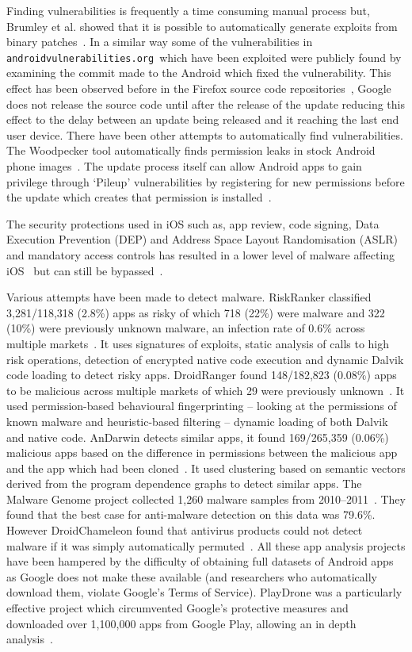 \documentclass[conference,a4paper,twoside]{IEEEtran}
\let\OldTodo\todo
\renewcommand{\todo}{\OldTodo[inline]}
\newcommand{\todolater}[1]{}%
\newcommand{\avo}{\texttt{androidvulnerabilities.org}}
\begin{document}
Finding vulnerabilities is frequently a time consuming manual process but, Brumley et al. showed that it is possible to automatically generate exploits from binary patches~\cite{Brumley2008}.
In a similar way some of the vulnerabilities\todolater{which?} in \avo\ which have been exploited were publicly found by examining the commit made to the Android which fixed the vulnerability.
This effect has been observed before in the Firefox source code repositories~\cite{Barth2011}, Google does not release the source code until after the release of the update reducing this effect to the delay between an update being released and it reaching the last end user device.
There have been other attempts to automatically find vulnerabilities.
The Woodpecker tool automatically finds permission leaks in stock Android phone images~\cite{Grace2012}.
The update process itself can allow Android apps to gain privilege through `Pileup' vulnerabilities by registering for new permissions before the update which creates that permission is installed~\cite{Xing2014}.

The security protections used in iOS such as, app review, code signing, Data Execution Prevention (DEP) and Address Space Layout Randomisation (ASLR) and mandatory access controls has resulted in a lower level of malware affecting iOS~\cite{Felt2011} but can still be bypassed~\cite{Wang2013a}.

Various attempts have been made to detect malware.
RiskRanker classified 3,281/118,318 (2.8\%) apps as risky of which 718 (22\%) were malware and 322 (10\%) were previously unknown malware, an infection rate of 0.6\% across multiple markets~\cite{Grace2012a}.
It uses signatures of exploits, static analysis of calls to high risk operations, detection of encrypted native code execution and dynamic Dalvik code loading to detect risky apps.
DroidRanger found 148/182,823 (0.08\%) apps to be malicious across multiple markets of which 29 were previously unknown~\cite{Zhou2012a}.
It used permission-based behavioural fingerprinting -- looking at the permissions of known malware and heuristic-based filtering -- dynamic loading of both Dalvik and native code.
AnDarwin detects similar apps, it found 169/265,359 (0.06\%) malicious apps based on the difference in permissions between the malicious app and the app which had been cloned~\cite{Crussell2013}.
It used clustering based on semantic vectors derived from the program dependence graphs to detect similar apps.
The Malware Genome project collected 1,260 malware samples from 2010--2011~\cite{Zhou2012b}.
They found that the best case for anti-malware detection on this data was 79.6\%.
However DroidChameleon found that antivirus products could not detect malware if it was simply automatically permuted~\cite{Rastogi2013}.
All these app analysis projects have been hampered by the difficulty of obtaining full datasets of Android apps as Google does not make these available (and researchers who automatically download them, violate Google's Terms of Service).
PlayDrone was a particularly effective project which circumvented Google's protective measures and downloaded over 1,100,000 apps from Google Play, allowing an in depth analysis~\cite{Viennot2014}.
\end{document}
